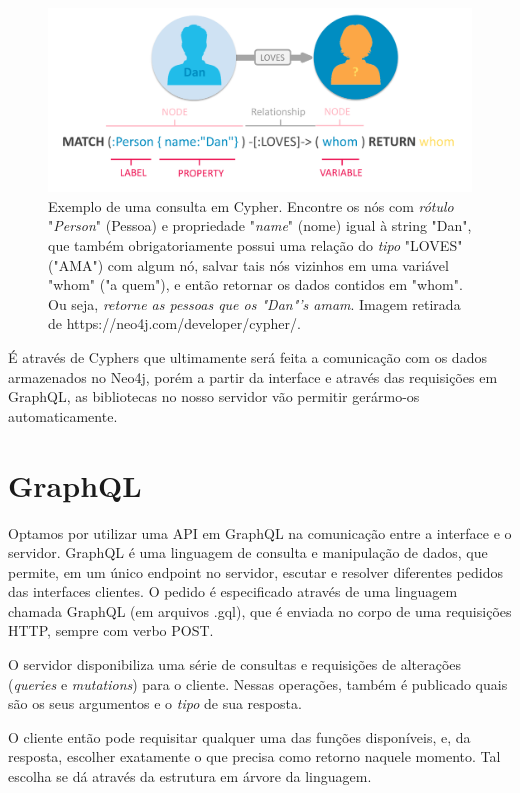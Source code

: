 \begin{figure}[H]
    \centering
    \includegraphics[width=1.0\linewidth]{Imagens/chap03/cypher-exemple.png}
    \caption{Exemplo de uma consulta em Cypher. Encontre os nós com \textit{rótulo} "\textit{Person}" (Pessoa) e propriedade "\textit{name}" (nome) igual à string "Dan", que também obrigatoriamente possui uma relação do \textit{tipo} "LOVES" ("AMA") com algum nó, salvar tais nós vizinhos em uma variável "whom" ("a quem"), e então retornar os dados contidos em "whom". Ou seja, \textit{retorne as pessoas que os "Dan"'s amam}. Imagem retirada de https://neo4j.com/developer/cypher/.}
    \label{fig:cypher-example}
\end{figure}
É através de Cyphers que ultimamente será feita a comunicação com os dados armazenados no Neo4j, porém a partir da interface e através das requisições em GraphQL, as bibliotecas no nosso servidor vão permitir gerármo-os automaticamente.

\section{GraphQL}

Optamos por utilizar uma API em GraphQL na comunicação entre a interface e o servidor. GraphQL é uma linguagem de consulta e manipulação de dados, que permite, em um único endpoint no servidor, escutar e resolver diferentes pedidos das interfaces clientes. O pedido é especificado através de uma linguagem chamada GraphQL (em arquivos .gql), que é enviada no corpo de uma requisições HTTP, sempre com verbo POST.

O servidor disponibiliza uma série de consultas e requisições de alterações (\textit{queries} e \textit{mutations}) para o cliente. Nessas operações, também é publicado quais são os seus argumentos e o \textit{tipo} de sua resposta.

O cliente então pode requisitar qualquer uma das funções disponíveis, e, da resposta, escolher exatamente o que precisa como retorno naquele momento. Tal escolha se dá através da estrutura em árvore da linguagem.

